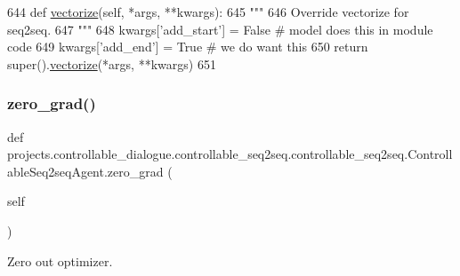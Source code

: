 \begin{DoxyCode}
644     \textcolor{keyword}{def }\hyperlink{namespaceparlai_1_1agents_1_1drqa_1_1utils_a5c76cc39e3014c7bcf9199d566dbdc0f}{vectorize}(self, *args, **kwargs):
645         \textcolor{stringliteral}{"""}
646 \textcolor{stringliteral}{        Override vectorize for seq2seq.}
647 \textcolor{stringliteral}{        """}
648         kwargs[\textcolor{stringliteral}{'add\_start'}] = \textcolor{keyword}{False}  \textcolor{comment}{# model does this in module code}
649         kwargs[\textcolor{stringliteral}{'add\_end'}] = \textcolor{keyword}{True}  \textcolor{comment}{# we do want this}
650         \textcolor{keywordflow}{return} super().\hyperlink{namespaceparlai_1_1agents_1_1drqa_1_1utils_a5c76cc39e3014c7bcf9199d566dbdc0f}{vectorize}(*args, **kwargs)
651 
\end{DoxyCode}
\mbox{\label{classprojects_1_1controllable__dialogue_1_1controllable__seq2seq_1_1controllable__seq2seq_1_1ControllableSeq2seqAgent_a72b442a0dfa9d106f7a82624823cb73e}} 
\subsubsection{\texorpdfstring{zero\+\_\+grad()}{zero\_grad()}}
{\footnotesize\ttfamily def projects.\+controllable\+\_\+dialogue.\+controllable\+\_\+seq2seq.\+controllable\+\_\+seq2seq.\+Controllable\+Seq2seq\+Agent.\+zero\+\_\+grad (\begin{DoxyParamCaption}\item[{}]{self }\end{DoxyParamCaption})}

\begin{DoxyVerb}Zero out optimizer.
\end{DoxyVerb}
 

